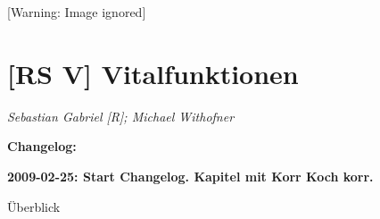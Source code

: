 \documentclass{article}
\makeatletter
\newcommand\gEs[1]{\textbf{\textcolor[rgb]{0.0,0.0,0.5019608}{#1}}}
\newcommand\gEs[1]{\textbf{\textcolor[rgb]{0.0,0.0,0.5019608}{#1}}}
\newcommand\captionof[1]{\def\@captype{#1}\caption}
\makeatother
\begin{document}
 [Warning: Image ignored] %
\captionof{figure}[Der weibliche Zyklus. Oben: Follikelreifung. Unten:
Auf- und Abbau der Uterusschleimhaut. Am Tag 0 des Zyklus wird die
Uterusschleimheut abgestossen, es kommt zur Regelblutung, danach wird
die Schleimhaut wieder aufgebaut. Am Tag 14 erfolgt der Eispung. Kommt
es zu keiner Befruchtung wird die Schleimheut erneut am Tag 28
abgesto{\ss}en. Nach einer Befruchtung wandert die Eizelle weiter in
den Uterus und nistet sich dort ein. ]{Der weibliche Zyklus. Oben:
Follikelreifung. Unten: Auf- und Abbau der Uterusschleimhaut. Am Tag 0
des Zyklus wird die Uterusschleimheut abgestossen, es kommt zur
Regelblutung, danach wird die Schleimhaut wieder aufgebaut. Am Tag 14
erfolgt der Eispung. Kommt es zu keiner Befruchtung wird die
Schleimheut erneut am Tag 28 abgesto{\ss}en. Nach einer Befruchtung
wandert die Eizelle weiter in den Uterus und nistet sich dort ein. }


\section{[RS V] Vitalfunktionen}
{\mdseries\itshape
Sebastian Gabriel [R]; Michael Withofner}

{\bfseries\color[rgb]{0.5019608,0.0,0.0}
\gEs{Changelog:}}

{\bfseries\color[rgb]{0.5019608,0.0,0.0}
2009-02-25: Start Changelog. Kapitel mit Korr Koch korr.}

{\mdseries\color[rgb]{0.0,0.0,0.5019608}
\"Uberblick}
\end{document}
